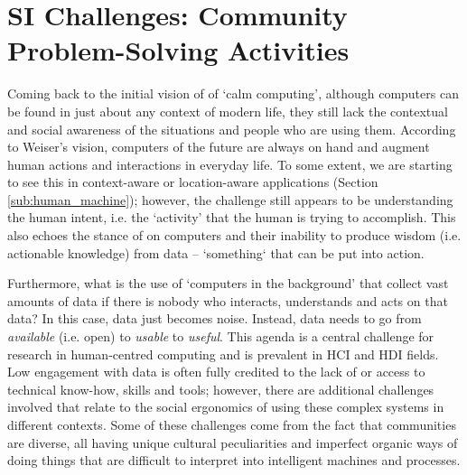 \section[Social Informatics Challenges]{SI Challenges: Community Problem-Solving Activities}
\label{sec:social_chall}
Coming back to the initial vision of \cite{weiser_computer_1991} of `calm computing', although computers can be found in just about any context of modern life, they still lack the contextual and social awareness of the situations and people who are using them. According to Weiser's vision, computers of the future are always on hand and augment human actions and interactions in everyday life. To some extent, we are starting to see this in context-aware or location-aware applications (Section \ref{sub:human_machine}); however, the challenge still appears to be understanding the human intent, i.e. the `activity' that the human is trying to accomplish. This also echoes the stance of \citet{ackoff_data_1999} on computers and their inability to produce wisdom (i.e. actionable knowledge) from data -- `something` that can be put into action.

Furthermore, what is the use of `computers in the background' that collect vast amounts of data if there is nobody who interacts, understands and acts on that data? In this case, data just becomes noise. Instead, data needs to go from \textit{available} (i.e. open) to \textit{usable} to \textit{useful}. This agenda is a central challenge for research in human-centred computing and is prevalent in HCI and HDI fields. Low engagement with data is often fully credited to the lack of or access to technical know-how, skills and tools; however, there are additional challenges involved that relate to the social ergonomics \citep{ferreira_social_2020,brown_issues_1985} of using these complex systems in different contexts. Some of these challenges come from the fact that communities are diverse, all having unique cultural peculiarities and imperfect organic ways of doing things that are difficult to interpret into intelligent machines and processes. 


